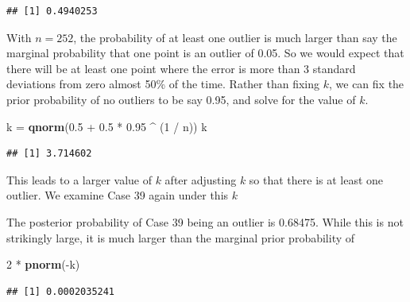 \documentclass[]{book}
\newenvironment{Shaded}{\begin{snugshade}}{\end{snugshade}}
\newcommand{\KeywordTok}[1]{\textcolor[rgb]{0.13,0.29,0.53}{\textbf{{#1}}}}
\newcommand{\DecValTok}[1]{\textcolor[rgb]{0.00,0.00,0.81}{{#1}}}
\newcommand{\FloatTok}[1]{\textcolor[rgb]{0.00,0.00,0.81}{{#1}}}
\newcommand{\StringTok}[1]{\textcolor[rgb]{0.31,0.60,0.02}{{#1}}}
\newcommand{\CommentTok}[1]{\textcolor[rgb]{0.56,0.35,0.01}{\textit{{#1}}}}
\newcommand{\NormalTok}[1]{{#1}}
\theoremstyle{definition}
\theoremstyle{definition}
\theoremstyle{definition}
\theoremstyle{remark}
\begin{document}
\begin{verbatim}
## [1] 0.4940253
\end{verbatim}

With \(n=252\), the probability of at least one outlier is much larger
than say the marginal probability that one point is an outlier of 0.05.
So we would expect that there will be at least one point where the error
is more than 3 standard deviations from zero almost 50\% of the time.
Rather than fixing \(k\), we can fix the prior probability of no
outliers to be say 0.95, and solve for the value of \(k\).

\begin{Shaded}
\begin{Highlighting}[]
\NormalTok{k =}\StringTok{ }\KeywordTok{qnorm}\NormalTok{(}\FloatTok{0.5} \NormalTok{+}\StringTok{ }\FloatTok{0.5} \NormalTok{*}\StringTok{ }\FloatTok{0.95} \NormalTok{^}\StringTok{ }\NormalTok{(}\DecValTok{1} \NormalTok{/}\StringTok{ }\NormalTok{n))}
\NormalTok{k}
\end{Highlighting}
\end{Shaded}

\begin{verbatim}
## [1] 3.714602
\end{verbatim}

This leads to a larger value of \(k\) after adjusting \(k\) so that
there is at least one outlier. We examine Case 39 again under this \(k\)

\begin{Shaded}
\end{Shaded}

The posterior probability of Case 39 being an outlier is 0.68475. While
this is not strikingly large, it is much larger than the marginal prior
probability of

\begin{Shaded}
\begin{Highlighting}[]
\DecValTok{2} \NormalTok{*}\StringTok{ }\KeywordTok{pnorm}\NormalTok{(-k)}
\end{Highlighting}
\end{Shaded}

\begin{verbatim}
## [1] 0.0002035241
\end{verbatim}
\end{document}
